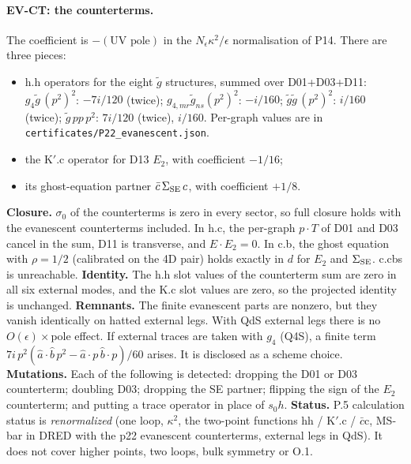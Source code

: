 \paragraph{EV-CT: the counterterms.} The coefficient is $-(\text{UV pole})$ in the $N_\epsilon\kappa^2/\epsilon$
normalisation of P14. There are three pieces:
\begin{itemize}
\item h.h operators for the eight $\tilde g$ structures, summed over D01+D03+D11:
$g_4\tilde g\,(p^2)^2$: $-7i/120$ (twice); $g_{4,mr}\tilde g_{ns}(p^2)^2$: $-i/160$;
$\tilde g\tilde g\,(p^2)^2$: $i/160$ (twice); $\tilde g\,pp\,p^2$: $7i/120$ (twice), $i/160$. Per-graph values are in
\texttt{certificates/P22\_evanescent.json}.
\item the K$'$.c operator for D13 $E_2$, with coefficient $-1/16$;
\item its ghost-equation partner $\bar c\,\Sigma_{\rm SE}\,c$, with coefficient $+1/8$.
\end{itemize}
\textbf{Closure.} $\sigma_0$ of the counterterms is zero in every sector, so full closure holds with the evanescent
counterterms included.
In h.c, the per-graph $p\cdot T$ of D01 and D03 cancel in the sum, D11 is transverse, and $E\cdot E_2=0$.
In c.b, the ghost equation with $\rho=1/2$ (calibrated on the 4D pair) holds exactly in $d$ for $E_2$ and $\Sigma_{\rm SE}$.
c.cbs is unreachable.
\textbf{Identity.} The h.h slot values of the counterterm sum are zero in all six external modes, and the K.c slot
values are zero, so the projected identity is unchanged.
\textbf{Remnants.} The finite evanescent parts are nonzero, but they vanish identically on hatted external legs. With
QdS external legs there is no $O(\epsilon)\times$pole effect. If external traces are taken with $g_4$ (Q4S), a finite
term $7i\,p^2(\hat a\cdot\hat b\,p^2-\hat a\cdot p\,\hat b\cdot p)/60$ arises. It is disclosed as a scheme choice.
\textbf{Mutations.} Each of the following is detected: dropping the D01 or D03 counterterm; doubling D03; dropping
the SE partner; flipping the sign of the $E_2$ counterterm; and putting a trace operator in place of $s_0h$.
\textbf{Status.} P.5 calculation status is \emph{renormalized} (one loop, $\kappa^2$, the two-point functions hh / K$'$.c /
$\bar c$c, MS-bar in DRED with the p22 evanescent counterterms, external legs in QdS). It does not cover higher points,
two loops, bulk symmetry or O.1.

